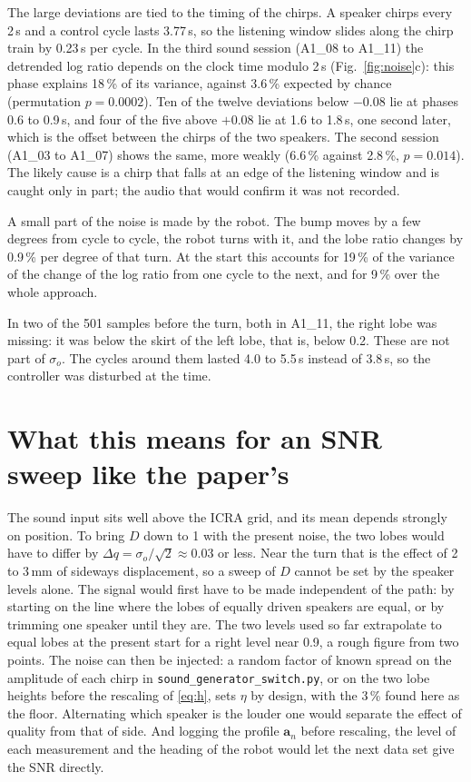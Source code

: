 \documentclass[11pt,a4paper]{article}
\newcommand{\dq}{\Delta q}
\newcommand{\so}{\sigma_o}
\newcommand{\code}[1]{\texttt{#1}}
\begin{document}
The large deviations are tied to the timing of the chirps. A speaker chirps every 2\,s and a
control cycle lasts 3.77\,s, so the listening window slides along the chirp train by 0.23\,s per cycle. In the third
sound session (A1\_08 to A1\_11) the detrended log ratio depends on the clock time modulo 2\,s
(Fig.~\ref{fig:noise}c): this phase explains 18\,\% of its variance, against 3.6\,\% expected by chance (permutation
$p=0.0002$). Ten of the twelve deviations below $-0.08$ lie at phases 0.6 to 0.9\,s, and four of the five above
$+0.08$ lie at 1.6 to 1.8\,s, one second later, which is the offset between the chirps of the two speakers. The
second session (A1\_03 to A1\_07) shows the same, more weakly (6.6\,\% against 2.8\,\%, $p=0.014$). The likely cause
is a chirp that falls at an edge of the listening window and is caught only in part; the audio that would confirm it
was not recorded.

A small part of the noise is made by the robot. The bump moves by a few
degrees from cycle to cycle, the robot turns with it, and the lobe ratio changes by 0.9\,\% per degree of that
turn. At the start this accounts for 19\,\% of the variance of the change of the log ratio from one cycle to the
next, and for 9\,\% over the whole approach.

In two of the 501 samples before the turn, both in A1\_11, the right lobe was missing: it
was below the skirt of the left lobe, that is, below 0.2. These are not part of $\so$. The cycles around them
lasted 4.0 to 5.5\,s instead of 3.8\,s, so the controller was disturbed at the time.

\section{What this means for an SNR sweep like the paper's}

The sound input sits well above the ICRA grid, and its mean depends strongly on position. To bring $D$ down to
1 with the present noise, the two lobes would have to differ by $\dq=\so/\sqrt2\approx0.03$ or less. Near the
turn that is the effect of 2 to 3\,mm of sideways displacement, so a sweep of $D$ cannot be set by the speaker
levels alone. The signal would first have to be made independent of the path: by starting on the line where the
lobes of equally driven speakers are equal, or by trimming one speaker until they are. The two levels used so
far extrapolate to equal lobes at the present start for a right level near 0.9, a rough figure from two points.
The noise can then be injected: a random factor of known spread on the amplitude of each chirp in
\code{sound\_generator\_switch.py}, or on the two lobe heights before the rescaling of \eqref{eq:h}, sets $\eta$ by
design, with the 3\,\% found here as the floor. Alternating which speaker is the louder one would separate the
effect of quality from that of side. And logging the profile $\bm{a}_n$ before rescaling, the level of each
measurement and the heading of the robot would let the next data set give the SNR directly.
\end{document}

